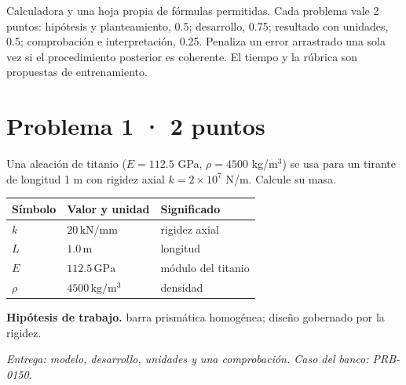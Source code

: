 
Calculadora y una hoja propia de fórmulas permitidas. Cada problema vale 2 puntos: hipótesis y planteamiento, 0.5; desarrollo, 0.75; resultado con unidades, 0.5; comprobación e interpretación, 0.25. Penaliza un error arrastrado una sola vez si el procedimiento posterior es coherente. El tiempo y la rúbrica son propuestas de entrenamiento.

\par\medskip\noindent\begin{minipage}{\linewidth}

\section{Problema 1 · 2 puntos}

Una aleación de titanio ($E = 112.5$ GPa, $\rho = 4500$ kg/m$^3$) se usa para un tirante de longitud 1 m con rigidez axial $k = 2\times 10^{7}$ N/m. Calcule su masa.

\par\medskip\noindent\begin{tabular}{@{}p{.18\linewidth}p{.26\linewidth}p{.48\linewidth}@{}}
\toprule Símbolo & Valor y unidad & Significado\\\midrule
$k$ & $20\,\mathrm{kN/mm}$ & rigidez axial\\
$L$ & $1.0\,\mathrm{m}$ & longitud\\
$E$ & $112.5\,\mathrm{GPa}$ & módulo del titanio\\
$\rho$ & $4500\,\mathrm{kg/m^3}$ & densidad\\
\bottomrule\end{tabular}\par\medskip



\par\textbf{Hipótesis de trabajo.} barra prismática homogénea; diseño gobernado por la rigidez.

\par\textit{Entrega: modelo, desarrollo, unidades y una comprobación. Caso del banco: PRB-0150.}\end{minipage}\par\medskip

